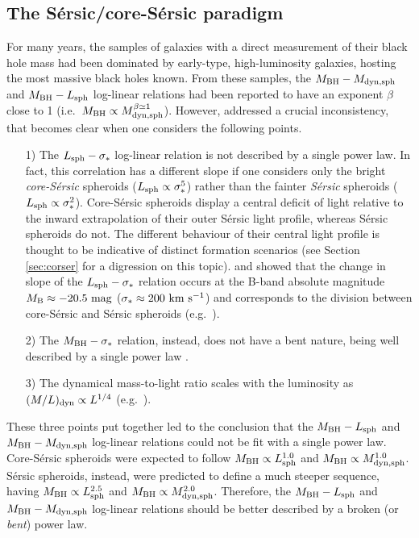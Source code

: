 \subsection{The S\'ersic/core-S\'ersic paradigm}  
\label{sec:bent}
For many years, the samples of galaxies with a direct measurement of their black hole mass 
had been dominated by early-type, high-luminosity galaxies, hosting the most massive black holes known. 
From these samples, the $M_{\rm BH} - M_{\rm dyn,sph}$ and $M_{\rm BH} - L_{\rm sph}$ log-linear relations 
had been reported to have an exponent $\beta$ close to 1 (i.e.~$M_{\rm BH} \propto M_{\rm dyn,sph}^{\beta \simeq 1}$). 
However, \cite{graham2012bent} addressed a crucial inconsistency, 
that becomes clear when one considers the following points. 

\begin{itemize} 
\item[1)] The $L_{\rm sph} - \sigma_*$ log-linear relation is not described by a single power law. %
	  In fact, this correlation has a different slope if one considers only the bright \emph{core-S\'ersic} spheroids
	  ($L_{\rm sph} \propto \sigma_*^5$) rather than the fainter \emph{S\'ersic} spheroids ($L_{\rm sph} \propto \sigma_*^2$).
	  Core-S\'ersic spheroids display a central deficit of light relative to the inward extrapolation of their 
	  outer S\'ersic light profile, whereas S\'ersic spheroids do not. 
	  The different behaviour of their central light profile is thought to be indicative of distinct formation scenarios 
	  (see Section \ref{sec:corser} for a digression on this topic).
	  \cite{davies1983} and \cite{matkovicguzman2005} showed that the change in slope of the $L_{\rm sph} - \sigma_*$ relation 
	  occurs at the B-band absolute magnitude $M_{\rm B} \approx -20.5~\rm mag$ ($\sigma_* \approx 200~\rm km~s^{-1}$) and corresponds to 
	  the division between core-S\'ersic and S\'ersic spheroids (e.g.~\citealt{grahamguzman2003}).
\item[2)] The $M_{\rm BH} - \sigma_*$ relation, instead, does not have a bent nature, 
          being well described by a single power law \citep{graham2012bent}.
\item[3)] The dynamical mass-to-light ratio scales with the luminosity as $(M/L)_{\rm dyn} \propto L^{1/4}$ (e.g.~\citealt{faber1987}).
\end{itemize}

These three points put together led to the conclusion that 
the $M_{\rm BH} - L_{\rm sph}$ and $M_{\rm BH} - M_{\rm dyn,sph}$ log-linear
relations could not be fit with a single power law. 
Core-S\'ersic spheroids were expected to follow $M_{\rm BH} \propto L_{\rm sph}^{1.0}$ and 
$M_{\rm BH} \propto M_{\rm dyn,sph}^{1.0}$.
S\'ersic spheroids, instead, were predicted to define a much steeper sequence, having $M_{\rm BH} \propto L_{\rm sph}^{2.5}$ and 
$M_{\rm BH} \propto M_{\rm dyn,sph}^{2.0}$.
Therefore, the $M_{\rm BH} - L_{\rm sph}$ and $M_{\rm BH} - M_{\rm dyn,sph}$ log-linear
relations should be better described by a broken (or \emph{bent}) power law. \\

